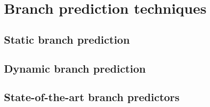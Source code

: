 \chapter{Branch prediction techniques}

\section{Static branch prediction}

\section{Dynamic branch prediction}\label{sec:dynbp}

\section{State-of-the-art branch predictors}